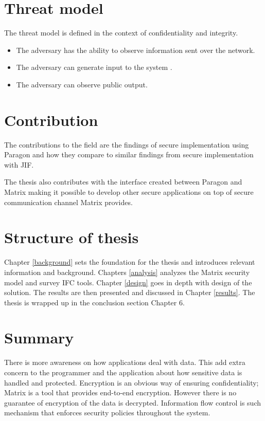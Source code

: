  \section{Threat model}
 The threat model is defined in the context of confidentiality and integrity.
 \begin{itemize}
 	\item The adversary has the ability to observe information sent over the network.
 	\item The adversary can generate input to the system .
 	\item The adversary can observe public output.   
 \end{itemize}
 
 
 
 
\section{Contribution} %

The contributions to the field are the findings of secure implementation using Paragon and how they compare to similar findings from secure implementation with JIF.

The thesis also contributes with the interface created between Paragon and Matrix making it possible to develop other secure applications on top of secure communication channel Matrix provides. 

 
 
\section{Structure of thesis} %

Chapter \ref{background} sets the foundation for the thesis and introduces relevant information and background. Chapters \ref{analysis} analyzes the Matrix security model and survey IFC tools. Chapter \ref{design} goes in depth with design of the solution. The results are then presented and discussed in Chapter \ref{results}. The thesis is wrapped up in the conclusion section Chapter 6. 
 
\section{Summary}
There is more awareness on how applications deal with data. This add extra concern to the programmer and the application about how sensitive data is handled and protected. Encryption is an obvious way of ensuring confidentiality; Matrix is a tool that provides end-to-end encryption. However there is no guarantee of encryption of the data is decrypted. Information flow control is such mechanism that enforces security policies throughout the system.

